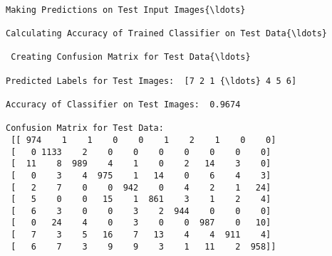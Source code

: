 \documentclass[11pt]{article}
\begin{document}
    \begin{Verbatim}[commandchars=\\\{\}]

Making Predictions on Test Input Images{\ldots}

Calculating Accuracy of Trained Classifier on Test Data{\ldots} 

 Creating Confusion Matrix for Test Data{\ldots}

Predicted Labels for Test Images:  [7 2 1 {\ldots} 4 5 6]

Accuracy of Classifier on Test Images:  0.9674

Confusion Matrix for Test Data: 
 [[ 974    1    1    0    0    1    2    1    0    0]
 [   0 1133    2    0    0    0    0    0    0    0]
 [  11    8  989    4    1    0    2   14    3    0]
 [   0    3    4  975    1   14    0    6    4    3]
 [   2    7    0    0  942    0    4    2    1   24]
 [   5    0    0   15    1  861    3    1    2    4]
 [   6    3    0    0    3    2  944    0    0    0]
 [   0   24    4    0    3    0    0  987    0   10]
 [   7    3    5   16    7   13    4    4  911    4]
 [   6    7    3    9    9    3    1   11    2  958]]

    \end{Verbatim}

    \begin{center}
    \end{center}
    { \hspace*{\fill} \\}
    
    \begin{center}
    \end{center}
    { \hspace*{\fill} \\}
    
    \begin{center}
    \end{center}
    { \hspace*{\fill} \\}
    
    \begin{center}
    \end{center}
    { \hspace*{\fill} \\}
    
\end{document}
